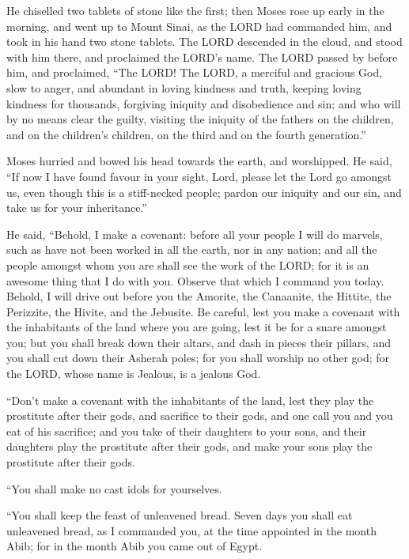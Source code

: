  He chiselled two tablets of stone like the first; then
Moses rose up early in the morning, and went up to Mount Sinai, as the
LORD had commanded him, and took in his hand two stone tablets.
 The LORD descended in the cloud, and stood with him there,
and proclaimed the LORD's name.  The LORD passed by before
him, and proclaimed, ``The LORD! The LORD, a merciful and gracious God,
slow to anger, and abundant in loving kindness and truth, 
keeping loving kindness for thousands, forgiving iniquity and
disobedience and sin; and who will by no means clear the guilty,
visiting the iniquity of the fathers on the children, and on the
children's children, on the third and on the fourth generation.''

 Moses hurried and bowed his head towards the earth, and
worshipped.  He said, ``If now I have found favour in your
sight, Lord, please let the Lord go amongst us, even though this is a
stiff-necked people; pardon our iniquity and our sin, and take us for
your inheritance.''

 He said, ``Behold, I make a covenant: before all your
people I will do marvels, such as have not been worked in all the earth,
nor in any nation; and all the people amongst whom you are shall see the
work of the LORD; for it is an awesome thing that I do with you.
 Observe that which I command you today. Behold, I will
drive out before you the Amorite, the Canaanite, the Hittite, the
Perizzite, the Hivite, and the Jebusite.  Be careful, lest
you make a covenant with the inhabitants of the land where you are
going, lest it be for a snare amongst you;  but you shall
break down their altars, and dash in pieces their pillars, and you shall
cut down their Asherah poles;  for you shall worship no
other god; for the LORD, whose name is Jealous, is a jealous God.

 ``Don't make a covenant with the inhabitants of the land,
lest they play the prostitute after their gods, and sacrifice to their
gods, and one call you and you eat of his sacrifice;  and
you take of their daughters to your sons, and their daughters play the
prostitute after their gods, and make your sons play the prostitute
after their gods.

 ``You shall make no cast idols for yourselves.

 ``You shall keep the feast of unleavened bread. Seven days
you shall eat unleavened bread, as I commanded you, at the time
appointed in the month Abib; for in the month Abib you came out of
Egypt.

